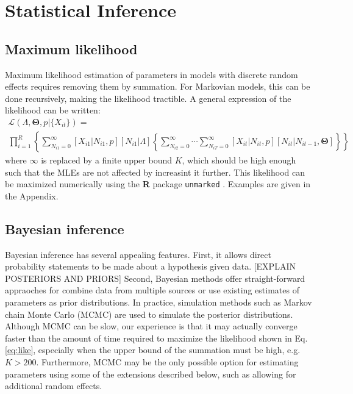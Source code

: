 \documentclass[12pt]{article}
\begin{document}
\section{Statistical Inference}

\subsection{Maximum likelihood}

Maximum likelihood estimation of parameters in models with discrete random
effects requires removing them by
summation. For Markovian models, this can be done recursively, making
the likelihood tractible. A general expression of the likelihood can be written:
\begin{multline}
  \mathcal{L}(\Lambda, \bm{\Theta}, p | \{X_{it}\}) = \\
  \prod_{i=1}^R \left\{ \sum_{N_{i1}=0}^{\infty}
  [X_{i1}|N_{i1}, p][N_{i1}|\Lambda] \left\{
  \sum_{N_{i2}=0}^{\infty} \dotsm \sum_{N_{iT}=0}^\infty
  [X_{it}|N_{it}, p][N_{it}|N_{it-1}, \bm{\Theta}] %
  \right\} \right\}
  \label{eq:like}
\end{multline}
where $\infty$ is replaced by a finite upper bound $K$, which should
be high enough such that the MLEs are not affected by increasint it
further. This likelihood can be maximized numerically using the \textbf{R}
package \texttt{unmarked} \citep{fiske_chandler:2011}. Examples are
given in the Appendix.


\subsection{Bayesian inference}

Bayesian inference has several appealing features. First, it allows
direct probability statements to be made about a hypothesis given
data. [EXPLAIN POSTERIORS AND PRIORS]
Second, Bayesian methods offer straight-forward appraoches for
combine data from multiple
sources or use existing estimates of parameters as prior
distributions. In practice, simulation methods such as Markov chain
Monte Carlo (MCMC) are used to simulate the posterior
distributions. Although MCMC can be slow, our experience is that it
may actually converge faster than the amount of time required to
maximize the likelihood shown in Eq.\ref{eq:like}, especially when the
upper bound of the summation must be high, e.g. $K>200$. Furthermore,
MCMC may be the only possible option for estimating parameters using
some of the extensions described below, such as allowing for
additional random effects.
\end{document}
